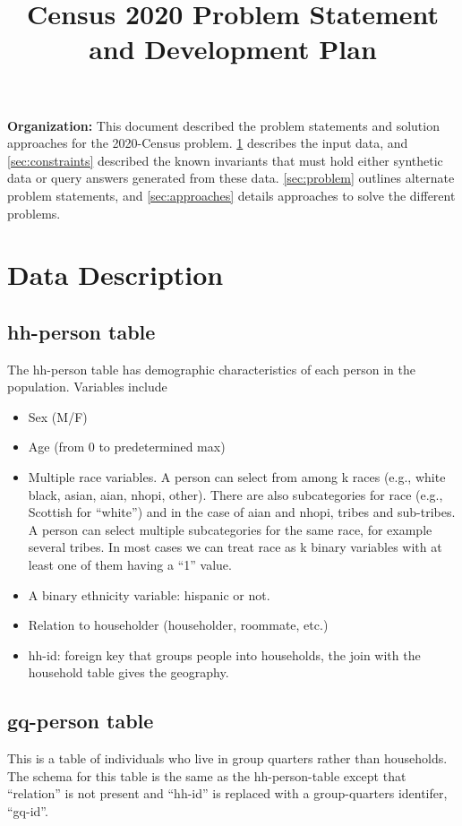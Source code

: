 \documentclass{amsart}
\begin{document}
\title{Census 2020 Problem Statement and Development Plan}
\maketitle

\noindent\textbf{Organization:} This document described the problem statements and solution approaches for the 2020-Census problem. \cref{sec:data} describes the input data, and \cref{sec:constraints} described the known invariants that must hold either synthetic data or query answers generated from these data. \cref{sec:problem} outlines alternate problem statements, and \cref{sec:approaches} details approaches to solve the different problems.
 


\section{Data Description} \label{sec:data}
\subsection{hh-person table}
The hh-person table has demographic characteristics of each person in the population. Variables include 
\begin{itemize}
\item Sex (M/F)
\item Age (from 0 to predetermined max)
\item Multiple race variables. A person can select from among k races (e.g., white black, asian, aian, nhopi, other).  There are also subcategories for race (e.g., Scottish for ``white'') and in the case of aian and nhopi, tribes and sub-tribes. A person can select multiple subcategories for the same race, for example several tribes. In most cases we can treat race as k binary variables with at least one of them having a ``1'' value.
\item A binary ethnicity variable: hispanic or not.
\item Relation to householder (householder, roommate, etc.)
\item hh-id: foreign key that groups people into households, the join with the household table gives the geography.
\end{itemize}

\subsection{gq-person table}
This is a table of individuals who live in group quarters rather than households. The schema for this table is the same as the hh-person-table except that ``relation'' is not present and ``hh-id'' is replaced with a group-quarters identifer, ``gq-id''.
\end{document}
